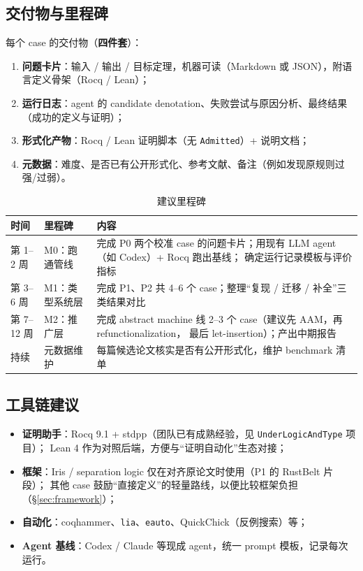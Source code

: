 \subsection{交付物与里程碑}

每个 case 的交付物（\textbf{四件套}）：
\begin{enumerate}
  \item \textbf{问题卡片}：输入 / 输出 / 目标定理，机器可读（Markdown 或 JSON），附语言定义骨架（Rocq / Lean）；
  \item \textbf{运行日志}：agent 的 candidate denotation、失败尝试与原因分析、最终结果（成功的定义与证明）；
  \item \textbf{形式化产物}：Rocq / Lean 证明脚本（无 \texttt{Admitted}）+ 说明文档；
  \item \textbf{元数据}：难度、是否已有公开形式化、参考文献、备注（例如发现原规则过强/过弱）。
\end{enumerate}

\begin{table}[htbp]
\centering
\caption{建议里程碑}
\label{tab:milestones}
\begin{tabular}{@{}p{}p{}p{}@{}}
\toprule
\textbf{时间} & \textbf{里程碑} & \textbf{内容} \\
\midrule
第 1--2 周 & M0：跑通管线 & 完成 P0 两个校准 case 的问题卡片；用现有 LLM agent（如 Codex）+ Rocq 跑出基线；
             确定运行记录模板与评价指标 \\
第 3--6 周 & M1：类型系统层 & 完成 P1、P2 共 4--6 个 case；整理``复现 / 迁移 / 补全''三类结果对比 \\
第 7--12 周 & M2：推广层 & 完成 abstract machine 线 2--3 个 case（建议先 AAM，再 refunctionalization，
             最后 let-insertion）；产出中期报告 \\
持续 & 元数据维护 & 每篇候选论文核实是否有公开形式化，维护 benchmark 清单 \\
\bottomrule
\end{tabular}
\end{table}

\subsection{工具链建议}

\begin{itemize}
  \item \textbf{证明助手}：Rocq 9.1 + stdpp（团队已有成熟经验，见 \texttt{UnderLogicAndType} 项目）；
        Lean 4 作为对照后端，方便与``证明自动化''生态对接；
  \item \textbf{框架}：Iris / separation logic 仅在对齐原论文时使用（P1 的 RustBelt 片段）；
        其他 case 鼓励``直接定义''的轻量路线，以便比较框架负担（\S\ref{sec:framework}）；
  \item \textbf{自动化}：coqhammer、\texttt{lia}、\texttt{eauto}、QuickChick（反例搜索）等；
  \item \textbf{Agent 基线}：Codex / Claude 等现成 agent，统一 prompt 模板，记录每次运行。
\end{itemize}
